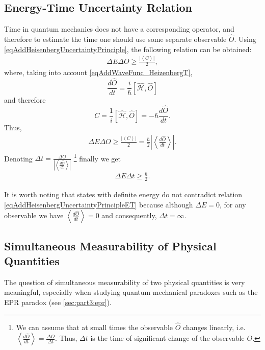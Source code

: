 \subsection{Energy-Time Uncertainty Relation}
\label{AddHeisenbergUncertaintyPrincipleEnergyTime}
Time in quantum mechanics does not have a corresponding operator, and therefore to estimate the time one should use some separate observable $\hat{O}$. Using
\eqref{eqAddHeisenbergUncertaintyPrinciple}, the following relation can be obtained:
\begin{eqnarray}
  \Delta E \Delta O \ge \frac{\left|\left< C \right>\right|}{2},
  \nonumber
\end{eqnarray}
where, taking into account \eqref{eqAddWaveFunc_HeizenbergT},
\[
\frac{d \hat{O}}{d t} = \frac{i}{\hbar}
\left[\hat{\mathcal{H}}, \hat{O}\right]
\]
and therefore
\[
C = \frac{1}{i}\left[\hat{\mathcal{H}}, \hat{O}\right] =
- \hbar \frac{d \hat{O}}{d t}.
\]
Thus,
\begin{eqnarray}
  \Delta E \Delta O \ge \frac{\left|\left< C \right>\right|}{2} =
  \frac{\hbar}{2}\left|\left<\frac{d \hat{O}}{d t}\right>\right|.
  \nonumber
\end{eqnarray}
Denoting $\Delta t = \frac{\Delta O}{\left|\left<\frac{d \hat{O}}{d
    t}\right>\right|}$
\footnote{
  We can assume that at small times the observable $\hat{O}$
  changes linearly, i.e. $\left<\frac{d \hat{O}}{dt}\right> =
  \frac{\Delta O}{\Delta t}$. Thus, $\Delta t$ is the time of significant
  change of the observable $O$. 
}
finally we get
\begin{eqnarray}
  \Delta E \Delta t \ge \frac{\hbar}{2}.
  \label{eqAddHeisenbergUncertaintyPrincipleET}
\end{eqnarray}

It is worth noting that states with definite energy do not contradict
relation \eqref{eqAddHeisenbergUncertaintyPrincipleET} because
although $\Delta E = 0$, for any observable we have
$\left<\frac{d \hat{O}}{dt}\right> = 0$ and consequently, $\Delta t =
\infty$. 

\subsection{Simultaneous Measurability of Physical Quantities}
\label{AddHeisenbergUncertaintyPrincipleMesuranmet}
The question of simultaneous measurability of two physical quantities is very meaningful, especially when studying quantum mechanical paradoxes such as the EPR paradox (see \autoref{sec:part3:epr}).

